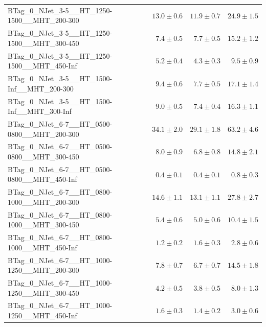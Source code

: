 \documentclass{beamer}
\begin{document}
\begin{frame}
\begin{tabular}{lrrr}
      BTag\_0\_NJet\_3-5\_\_HT\_1250-1500\_\_MHT\_200-300 &              $13.0\pm0.6$&              $11.9\pm0.7$&                  $24.9\pm1.5$ \\ 
      BTag\_0\_NJet\_3-5\_\_HT\_1250-1500\_\_MHT\_300-450 &               $7.4\pm0.5$&               $7.7\pm0.5$&                  $15.2\pm1.2$ \\ 
      BTag\_0\_NJet\_3-5\_\_HT\_1250-1500\_\_MHT\_450-Inf &               $5.2\pm0.4$&               $4.3\pm0.3$&                   $9.5\pm0.9$ \\ 
       BTag\_0\_NJet\_3-5\_\_HT\_1500-Inf\_\_MHT\_200-300 &               $9.4\pm0.6$&               $7.7\pm0.5$&                  $17.1\pm1.4$ \\ 
       BTag\_0\_NJet\_3-5\_\_HT\_1500-Inf\_\_MHT\_300-Inf &               $9.0\pm0.5$&               $7.4\pm0.4$&                  $16.3\pm1.1$ \\ 
      BTag\_0\_NJet\_6-7\_\_HT\_0500-0800\_\_MHT\_200-300 &              $34.1\pm2.0$&              $29.1\pm1.8$&                  $63.2\pm4.6$ \\ 
      BTag\_0\_NJet\_6-7\_\_HT\_0500-0800\_\_MHT\_300-450 &               $8.0\pm0.9$&               $6.8\pm0.8$&                  $14.8\pm2.1$ \\ 
      BTag\_0\_NJet\_6-7\_\_HT\_0500-0800\_\_MHT\_450-Inf &               $0.4\pm0.1$&               $0.4\pm0.1$&                   $0.8\pm0.3$ \\ 
      BTag\_0\_NJet\_6-7\_\_HT\_0800-1000\_\_MHT\_200-300 &              $14.6\pm1.1$&              $13.1\pm1.1$&                  $27.8\pm2.7$ \\ 
      BTag\_0\_NJet\_6-7\_\_HT\_0800-1000\_\_MHT\_300-450 &               $5.4\pm0.6$&               $5.0\pm0.6$&                  $10.4\pm1.5$ \\ 
      BTag\_0\_NJet\_6-7\_\_HT\_0800-1000\_\_MHT\_450-Inf &               $1.2\pm0.2$&               $1.6\pm0.3$&                   $2.8\pm0.6$ \\ 
      BTag\_0\_NJet\_6-7\_\_HT\_1000-1250\_\_MHT\_200-300 &               $7.8\pm0.7$&               $6.7\pm0.7$&                  $14.5\pm1.8$ \\ 
      BTag\_0\_NJet\_6-7\_\_HT\_1000-1250\_\_MHT\_300-450 &               $4.2\pm0.5$&               $3.8\pm0.5$&                   $8.0\pm1.3$ \\ 
      BTag\_0\_NJet\_6-7\_\_HT\_1000-1250\_\_MHT\_450-Inf &               $1.6\pm0.3$&               $1.4\pm0.2$&                   $3.0\pm0.6$ \\ 

\end{tabular}
\end{frame}
\end{document}
